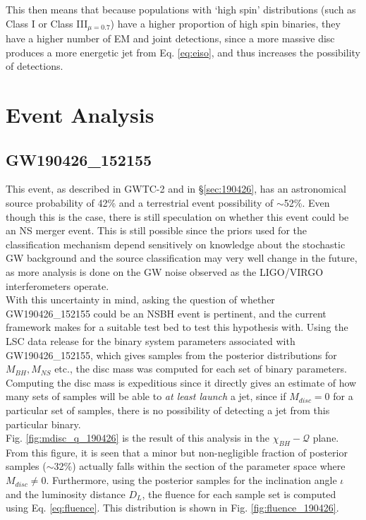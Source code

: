     This then means that because populations with `high spin' distributions (such as
    Class I or Class III$_{\mu = 0.7}$) have a higher proportion of high spin binaries,
    they have a higher number of EM and joint detections, since a more massive disc
    produces a more energetic jet from Eq. \ref{eq:eiso}, and thus increases the
    possibility of detections.

\section{Event Analysis}\label{sec:event_analysis}

    \subsection{GW190426\_152155}\label{ssec:nsbh_190426}

        This event, as described in GWTC-2 and in \S\ref{sec:190426}, has an
        astronomical source probability of 42\% and a terrestrial event possibility of
        $\sim$52\%. Even though this is the case, there is still speculation on whether
        this event could be an NS merger event.  This is still possible since the priors
        used for the classification mechanism depend sensitively on knowledge about the
        stochastic GW background and the source classification may very well change in
        the future, as more analysis is done on the GW noise observed as the LIGO/VIRGO
        interferometers operate.\\
        With this uncertainty in mind, asking the question of whether GW190426\_152155
        could be an NSBH event is pertinent, and the current framework makes for a
        suitable test bed to test this hypothesis with. Using the LSC data release for
        the binary system parameters associated with GW190426\_152155, which gives
        samples from the posterior distributions for $M_{BH}, M_{NS}$ etc., the disc
        mass was computed for each set of binary parameters. Computing the disc mass is
        expeditious since it directly gives an estimate of how many sets of samples will
        be able to \textit{at least launch} a jet, since if $M_{disc} = 0$ for a
        particular set of samples, there is no possibility of detecting a jet from this
        particular binary.\\
        Fig. \ref{fig:mdisc_q_190426} is the result of this analysis in the
        $\chi_{BH}-\mathcal{Q}$ plane. From this figure, it is seen that a minor but
        non-negligible fraction of posterior samples ($\sim$32\%) actually falls within
        the section of the parameter space where $M_{disc} \neq 0$. Furthermore, using
        the posterior samples for the inclination angle $\iota$ and the luminosity
        distance $D_L$, the fluence for each sample set is computed using Eq.
        \ref{eq:fluence}.  This distribution is shown in Fig.
        \ref{fig:fluence_190426}.\\

